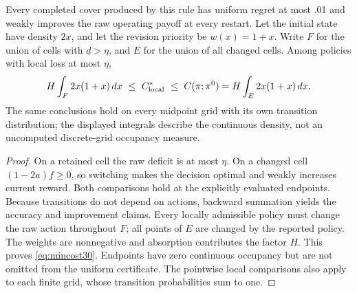\begin{proposition}\label{prop:implemented30}
Every completed cover produced by this rule has uniform regret at most .01 and weakly improves the raw operating payoff at every restart. Let the initial state have density $2x$, and let the revision priority be $w(x)=1+x$. Write $F$ for the union of cells with $\underline d>\eta$, and $E$ for the union of all changed cells. Among policies with local loss at most $\eta$,
\begin{equation}\label{eq:mincost30}
 H\int_F 2x(1+x)\,dx\ \le\ C_{\rm local}^*\ \le\
 C(\pi;\pi^0)=H\int_E2x(1+x)\,dx.
\end{equation}
The same conclusions hold on every midpoint grid with its own transition distribution; the displayed integrals describe the continuous density, not an uncomputed discrete-grid occupancy measure.
\end{proposition}
\begin{proof}
On a retained cell the raw deficit is at most $\eta$. On a changed cell $(1-2a)f\ge0$, so switching makes the decision optimal and weakly increases current reward. Both comparisons hold at the explicitly evaluated endpoints. Because transitions do not depend on actions, backward summation yields the accuracy and improvement claims. Every locally admissible policy must change the raw action throughout $F$; all points of $E$ are changed by the reported policy. The weights are nonnegative and absorption contributes the factor $H$. This proves \eqref{eq:mincost30}. Endpoints have zero continuous occupancy but are not omitted from the uniform certificate. The pointwise local comparisons also apply to each finite grid, whose transition probabilities sum to one.\end{proof}

